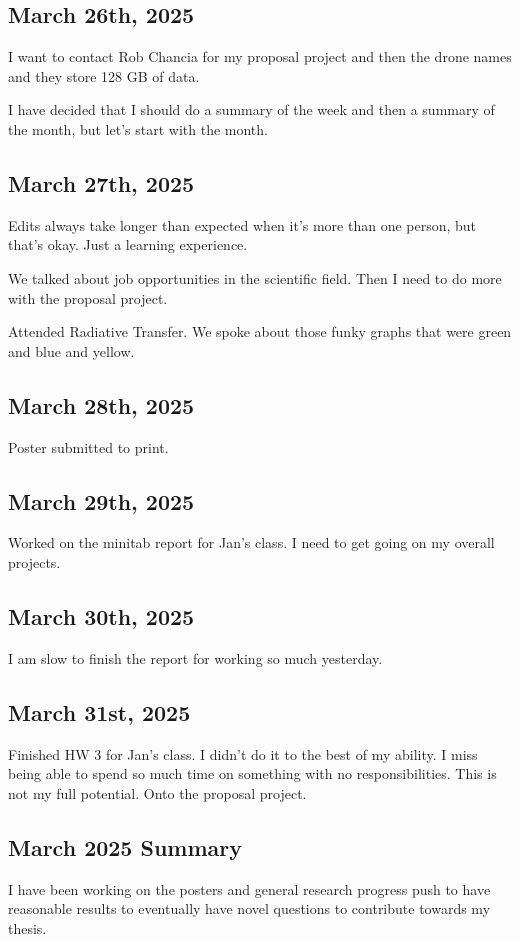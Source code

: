 \documentclass{article}
\begin{document}
\subsection{March 26th, 2025}
I want to contact Rob Chancia for my proposal project and then the drone names and they store 128 GB of data. 

I have decided that I should do a summary of the week and then a summary of the month, but let's start with the month. 


\subsection{March 27th, 2025}
Edits always take longer than expected when it's more than one person, but that's okay. Just a learning experience. 

We talked about job opportunities in the scientific field. Then I need to do more with the proposal project. 

Attended Radiative Transfer. We spoke about those funky graphs that were green and blue and yellow.

\subsection{March 28th, 2025}
Poster submitted to print.

\subsection{March 29th, 2025}
Worked on the minitab report for Jan's class. I need to get going on my overall projects. 

\subsection{March 30th, 2025}
I am slow to finish the report for working so much yesterday. 

\subsection{March 31st, 2025}
Finished HW 3 for Jan's class. I didn't do it to the best of my ability. I miss being able to spend so much time on something with no responsibilities. This is not my full potential. Onto the proposal project. 

\subsection{March 2025 Summary}
I have been working on the posters and general research progress push to have reasonable results to eventually have novel questions to contribute towards my thesis. 
\end{document}
